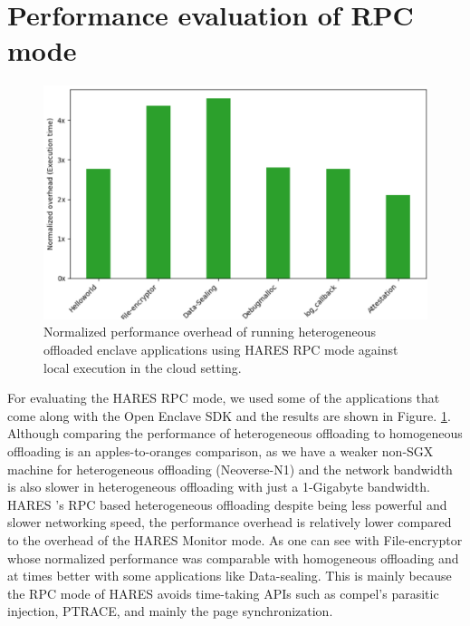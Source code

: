\documentclass[article, doublespace,nopageskip]{VTthesis} %
\newcommand{\monitor}{HARES }
\begin{document}
    \section{Performance evaluation of RPC mode} \label{sse:Performance evaluation of RPC mode}
        \begin{figure}[htb]
            \centering
            \includegraphics[scale=0.7]{figures/Normalized_performance_rpc.png}
            \caption{Normalized performance overhead of running heterogeneous offloaded enclave applications using HARES RPC mode against local execution in the cloud setting.} 
            \label{fig:rpc_enclave_offloading}
        \end{figure}

    For evaluating the \monitor RPC mode, we used some of the applications that come along with the Open Enclave SDK and the results are shown in Figure. \ref{fig:rpc_enclave_offloading}. Although comparing the performance of heterogeneous offloading to homogeneous offloading is an apples-to-oranges comparison, as we have a weaker non-SGX machine for heterogeneous offloading (Neoverse-N1) and the network bandwidth is also slower in heterogeneous offloading with just a 1-Gigabyte bandwidth. \monitor's RPC based heterogeneous offloading despite being less powerful and slower networking speed, the performance overhead is relatively lower compared to the overhead of the \monitor Monitor mode. As one can see with File-encryptor whose normalized performance was comparable with homogeneous offloading and at times better with some applications like Data-sealing. This is mainly because the RPC mode of \monitor avoids time-taking APIs such as compel's parasitic injection, PTRACE, and mainly the page synchronization.
    
    
\end{document}
